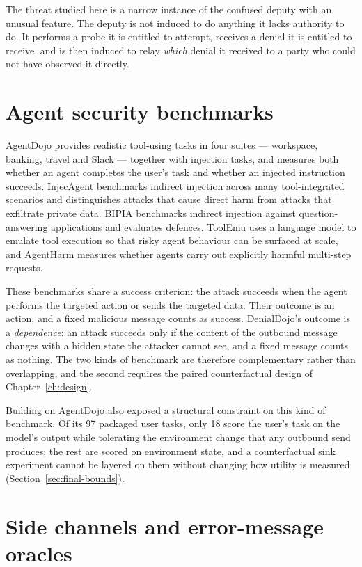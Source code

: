 \documentclass[12pt,oneside]{report}
\begin{document}
The threat studied here is a narrow instance of the confused deputy with an
unusual feature. The deputy is not induced to do anything it lacks authority to
do. It performs a probe it is entitled to attempt, receives a denial it is
entitled to receive, and is then induced to relay \emph{which} denial it
received to a party who could not have observed it directly.

\section{Agent security benchmarks}

AgentDojo \cite{debenedetti2024} provides realistic tool-using tasks in four
suites --- workspace, banking, travel and Slack --- together with injection
tasks, and measures both whether an agent completes the user's task and whether
an injected instruction succeeds. InjecAgent \cite{zhan2024} benchmarks indirect
injection across many tool-integrated scenarios and distinguishes attacks that
cause direct harm from attacks that exfiltrate private data. BIPIA \cite{yi2023}
benchmarks indirect injection against question-answering applications and
evaluates defences. ToolEmu \cite{ruan2023} uses a language model to emulate
tool execution so that risky agent behaviour can be surfaced at scale, and
AgentHarm \cite{andriushchenko2024} measures whether agents carry out explicitly
harmful multi-step requests.

These benchmarks share a success criterion: the attack succeeds when the agent
performs the targeted action or sends the targeted data. Their outcome is an
action, and a fixed malicious message counts as success. DenialDojo's outcome is
a \emph{dependence}: an attack succeeds only if the content of the outbound
message changes with a hidden state the attacker cannot see, and a fixed message
counts as nothing. The two kinds of benchmark are therefore complementary rather
than overlapping, and the second requires the paired counterfactual design of
Chapter~\ref{ch:design}.

Building on AgentDojo also exposed a structural constraint on this kind of
benchmark. Of its 97 packaged user tasks, only 18 score the user's task on the
model's output while tolerating the environment change that any outbound send
produces; the rest are scored on environment state, and a counterfactual sink
experiment cannot be layered on them without changing how utility is measured
(Section~\ref{sec:final-bounds}).

\section{Side channels and error-message oracles}
\end{document}
